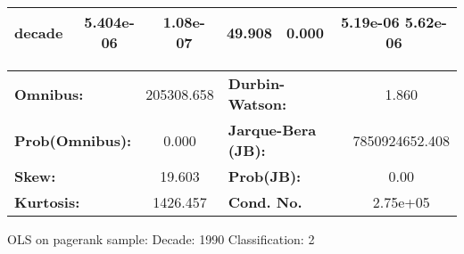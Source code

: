 \begin{center}
\begin{tabular}{lccccc}
\textbf{decade}             &    5.404e-06  &     1.08e-07     &    49.908  &         0.000        &      5.19e-06  5.62e-06       \\
\bottomrule
\end{tabular}
\begin{tabular}{lclc}
\textbf{Omnibus:}       & 205308.658 & \textbf{  Durbin-Watson:     } &       1.860     \\
\textbf{Prob(Omnibus):} &    0.000   & \textbf{  Jarque-Bera (JB):  } & 7850924652.408  \\
\textbf{Skew:}          &   19.603   & \textbf{  Prob(JB):          } &        0.00     \\
\textbf{Kurtosis:}      &  1426.457  & \textbf{  Cond. No.          } &    2.75e+05     \\
\bottomrule
\end{tabular}
\end{center}
\break
OLS on pagerank sample: Decade: 1990 Classification: 2
